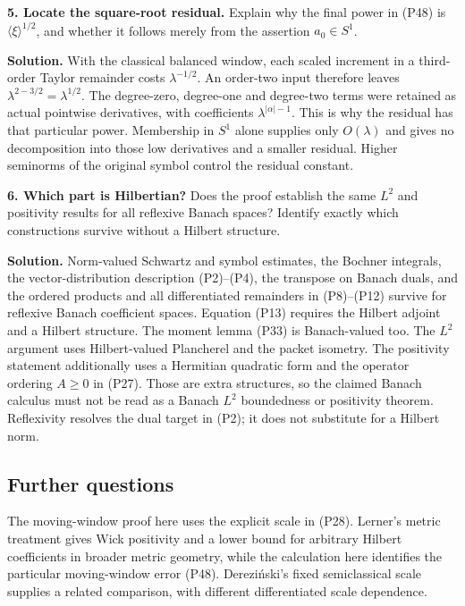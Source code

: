\documentclass[
  11pt,
]{article}
\begin{document}
\textbf{5. Locate the square-root residual.} Explain why the final power
in (P48) is \(\langle\xi\rangle^{1/2}\), and whether it follows merely
from the assertion \(a_0\in S^1\).

\textbf{Solution.} With the classical balanced window, each scaled
increment in a third-order Taylor remainder costs \(\lambda^{-1/2}\). An
order-two input therefore leaves \(\lambda^{2-3/2}=\lambda^{1/2}\). The
degree-zero, degree-one and degree-two terms were retained as actual
pointwise derivatives, with coefficients \(\lambda^{|\alpha|-1}\). This
is why the residual has that particular power. Membership in \(S^1\)
alone supplies only \(O(\lambda)\) and gives no decomposition into those
low derivatives and a smaller residual. Higher seminorms of the original
symbol control the residual constant.

\textbf{6. Which part is Hilbertian?} Does the proof establish the same
\(L^2\) and positivity results for all reflexive Banach spaces? Identify
exactly which constructions survive without a Hilbert structure.

\textbf{Solution.} Norm-valued Schwartz and symbol estimates, the
Bochner integrals, the vector-distribution description (P2)--(P4), the
transpose on Banach duals, and the ordered products and all
differentiated remainders in (P8)--(P12) survive for reflexive Banach
coefficient spaces. Equation (P13) requires the Hilbert adjoint and a
Hilbert structure. The moment lemma (P33) is Banach-valued too. The
\(L^2\) argument uses Hilbert-valued Plancherel and the packet isometry.
The positivity statement additionally uses a Hermitian quadratic form
and the operator ordering \(A\geq0\) in (P27). Those are extra
structures, so the claimed Banach calculus must not be read as a Banach
\(L^2\) boundedness or positivity theorem. Reflexivity resolves the dual
target in (P2); it does not substitute for a Hilbert norm.

\subsection{Further questions}\label{further-questions}

The moving-window proof here uses the explicit scale in (P28). Lerner's
metric treatment gives Wick positivity and a lower bound for arbitrary
Hilbert coefficients in broader metric geometry, while the calculation
here identifies the particular moving-window error (P48). Dereziński's
fixed semiclassical scale supplies a related comparison, with different
differentiated scale dependence.
\end{document}
